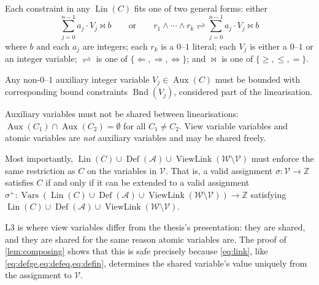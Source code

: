 \documentclass[11pt,a4paper]{article}
\theoremstyle{plain}
\theoremstyle{definition}
\theoremstyle{remark}
\newcommand{\fname}[1]{\ensuremath{\operatorname{#1}}}
\newcommand{\Bnd}{\fname{Bnd}}
\newcommand{\Def}{\fname{Def}}
\newcommand{\Lin}{\fname{Lin}}
\newcommand{\Aux}{\fname{Aux}}
\newcommand{\Vars}{\fname{Vars}}
\newcommand{\ViewLink}{\fname{ViewLink}}
\begin{document}
\begin{description}[font=\normalfont\bfseries,leftmargin=2.4em]
  \item[L1.] Each constraint in any $\Lin(C)$ fits one of two general forms:
    either
    \begin{equation}
      \sum_{j=0}^{n-1} a_j\cdot V_j \bowtie b
      \qquad\text{or}\qquad
      r_1\wedge\cdots\wedge r_k \rightleftharpoons \sum_{j=0}^{n-1} a_j\cdot V_j \bowtie b
      \label{eq:forms}
    \end{equation}
    where $b$ and each $a_j$ are integers; each $r_k$ is a $0$--$1$ literal;
    each $V_j$ is either a $0$--$1$ or an integer variable; $\rightleftharpoons$
    is one of $\{\Leftarrow,\Rightarrow,\Leftrightarrow\}$; and $\bowtie$ is one
    of $\{\geq,\leq,=\}$.
  \item[L2.] Any non-$0$--$1$ auxiliary integer variable $V_j\in\Aux(C)$ must be
    bounded with corresponding bound constraints $\Bnd(V_j)$, considered part of
    the linearisation.
  \item[L3.] Auxiliary variables must not be shared between linearisations:
    $\Aux(C_1)\cap\Aux(C_2)=\emptyset$ for all $C_1\neq C_2$.  View variable
    variables and atomic variables are \emph{not} auxiliary variables and may be
    shared freely.
  \item[L4.] Most importantly, $\Lin(C)\cup\Def(\mathcal A)\cup\ViewLink(\mathcal W\setminus\mathcal V)$
    must enforce the same restriction as $C$ on the variables in $\mathcal V$.
    That is, a valid assignment $\sigma:\mathcal V\to\mathbb Z$ satisfies $C$ if
    and only if it can be extended to a valid assignment
    $\sigma^+:\Vars(\Lin(C)\cup\Def(\mathcal A)\cup\ViewLink(\mathcal W\setminus\mathcal V))\to\mathbb Z$
    satisfying $\Lin(C)\cup\Def(\mathcal A)\cup\ViewLink(\mathcal W\setminus\mathcal V)$.
\end{description}

L3 is where view variables differ from the thesis's presentation:
they are shared, and they are shared for the same reason atomic variables are.
The proof of \cref{lem:composing} shows that this is safe precisely because
\cref{eq:link}, like \cref{eq:defge,eq:defeq,eq:defin}, determines the shared
variable's value uniquely from the assignment to $\mathcal V$.
\end{document}

